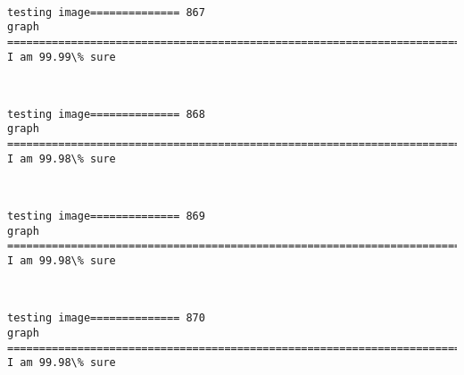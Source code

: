 \documentclass[11pt]{article}
\begin{document}
    \begin{center}
    \end{center}
    { \hspace*{\fill} \\}
    
    \begin{Verbatim}[commandchars=\\\{\}]
testing image============== 867
graph
============================================================================
I am 99.99\% sure

    \end{Verbatim}

    \begin{center}
    \end{center}
    { \hspace*{\fill} \\}
    
    \begin{Verbatim}[commandchars=\\\{\}]
testing image============== 868
graph
============================================================================
I am 99.98\% sure

    \end{Verbatim}

    \begin{center}
    \end{center}
    { \hspace*{\fill} \\}
    
    \begin{Verbatim}[commandchars=\\\{\}]
testing image============== 869
graph
============================================================================
I am 99.98\% sure

    \end{Verbatim}

    \begin{center}
    \end{center}
    { \hspace*{\fill} \\}
    
    \begin{Verbatim}[commandchars=\\\{\}]
testing image============== 870
graph
============================================================================
I am 99.98\% sure

    \end{Verbatim}
\end{document}
